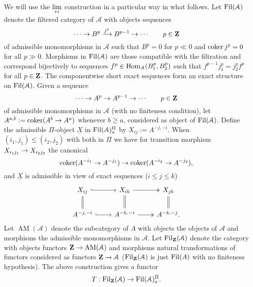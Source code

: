 \documentclass[deligne.tex]{subfiles}
\begin{document}
We will use the $\displaystyle\lim_{\leftrightarrow}$ construction in a particular way in what follows.
Let $\operatorname{Fil}(\mathcal A)$ denote the filtered category of $\mathcal A$ with
objects sequences
\begin{equation*}
	\cdots\rightarrow B^p\xrightarrow{j^p} B^{p-1}\rightarrow\cdots\qquad p\in\mathbf{Z}
\end{equation*}
of admissible monomorphisms in $\mathcal A$ such that $B^p=0$ for $p\ll0$
and $\operatorname{coker} j^p=0$ for all $p\gg0$. Morphisms in $\operatorname{Fil}(\mathcal A)$ are
those compatible with the filtration and correspond bijectively to sequences
$f^p\in\operatorname{Hom}_{\mathcal A}(B_1^p,B_2^p)$ such that $f^{p-1}j_1^p=j_2^pf^p$ for 
all $p\in\mathbf{Z}$. The componentwise short exact sequences form an exact
structure on $\operatorname{Fil}(\mathcal A)$. Given a sequence
\begin{equation*}
	\cdots\rightarrow A^p\rightarrow A^{p-1}\rightarrow\cdots\qquad p\in\mathbf{Z}
\end{equation*}
of admissible monomorphisms in $\mathcal A$ (with no finiteness condition),
let $A^{a,b}:=\operatorname{coker}(A^b\rightarrow A^a)$ whenever $b\geq a$, considered as object
of $\operatorname{Fil}(\mathcal A)$. Define the admissible $\Pi$-object $\underline X$ in
$\operatorname{Fil}(\mathcal A)_a^\Pi$ by $X_{ij}:=A^{-j,-i}$.
When $(i_1,j_1)\leq(i_2,j_2)$ with both in $\Pi$ we have for transition
morphism $X_{i_1j_1}\rightarrow X_{i_2j_2}$ the canonical
\begin{equation*}
	\operatorname{coker}(A^{-i_1}\rightarrow A^{-j_1})\rightarrow\operatorname{coker}(A^{-i_2}\rightarrow A^{-j_2}),
\end{equation*}
and $\underline X$ is admissible in view of exact sequences
($i\leq j\leq k$)
\begin{equation*}\begin{tikzcd}
	X_{ij}\arrow[r,hook]\arrow[d,equals]
	&X_{ik}\arrow[r,twoheadrightarrow]\arrow[d,equals]
	&X_{jk}\arrow[d,equals] \\
	A^{-j,-i}\arrow[r,hook]&A^{-k,-i}\arrow[r,twoheadrightarrow]&A^{-k,-j}.
\end{tikzcd}\end{equation*}
Let $\operatorname{AM}(\mathcal A)$ denote the subcategory of $A$ with
objects the objects of $\mathcal A$ and morphisms the admissible 
monomorphisms in $\mathcal A$. Let $\operatorname{Fil}_{\mathbf{Z}}(\mathcal A)$ denote the category
with objects functors $\mathbf{Z}\rightarrow\operatorname{AM}(\mathcal A)$ and morphisms
natural transformations of functors considered as functors
$\mathbf{Z}\rightarrow\mathcal A$ ($\operatorname{Fil}_{\mathbf{Z}}(\mathcal A)$ is just $\operatorname{Fil}(A)$ with no finiteness 
hypothesis). The above construction gives a functor
\begin{equation*}
	T:\operatorname{Fil}_{\mathbf{Z}}(\mathcal A)\rightarrow\operatorname{Fil}(\mathcal A)_a^\Pi.
\end{equation*}
\end{document}
